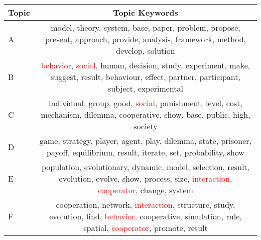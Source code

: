 \begin{tabular}{lc}
\toprule
Topic & Topic Keywords \\
\midrule
A &                     model, theory, system, base, paper, problem, propose, present, approach, provide, analysis, framework, method, develop, solution \\
B &          \textcolor{red}{behavior}, \textcolor{red}{social}, human, decision, study, experiment, make, suggest, result, behaviour, effect, partner, participant, subject, experimental \\
C &                         individual, group, good, \textcolor{red}{social}, punishment, level, cost, mechanism, dilemma, cooperative, show, base, public, high, society \\
D &                          game, strategy, player, agent, play, dilemma, state, prisoner, payoff, equilibrium, result, iterate, set, probability, show \\
E &         population, evolutionary, dynamic, model, selection, result, evolution, evolve, show, process, size, \textcolor{red}{interaction}, \textcolor{red}{cooperator}, change, system \\
F &  cooperation, network, \textcolor{red}{interaction}, structure, study, evolution, find, \textcolor{red}{behavior}, cooperative, simulation, rule, spatial, \textcolor{red}{cooperator}, promote, result \\
\bottomrule
\end{tabular}
